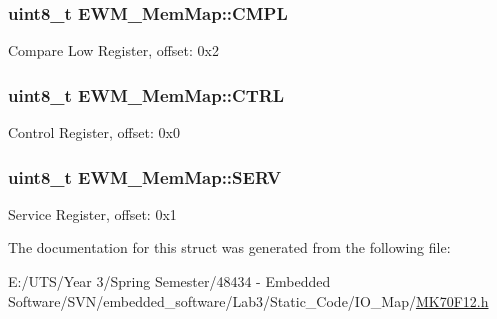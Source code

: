 \subsubsection[{C\+M\+P\+L}]{\setlength{\rightskip}{0pt plus 5cm}uint8\+\_\+t E\+W\+M\+\_\+\+Mem\+Map\+::\+C\+M\+P\+L}\label{struct_e_w_m___mem_map_ada0221f7554297f23a0257f54f28f5fc}
Compare Low Register, offset\+: 0x2 \hypertarget{struct_e_w_m___mem_map_a033a88d44ad1daa23ce3deb13bc94811}{}
\subsubsection[{C\+T\+R\+L}]{\setlength{\rightskip}{0pt plus 5cm}uint8\+\_\+t E\+W\+M\+\_\+\+Mem\+Map\+::\+C\+T\+R\+L}\label{struct_e_w_m___mem_map_a033a88d44ad1daa23ce3deb13bc94811}
Control Register, offset\+: 0x0 \hypertarget{struct_e_w_m___mem_map_aa9c25d4775f785d6911e096a226f4e40}{}
\subsubsection[{S\+E\+R\+V}]{\setlength{\rightskip}{0pt plus 5cm}uint8\+\_\+t E\+W\+M\+\_\+\+Mem\+Map\+::\+S\+E\+R\+V}\label{struct_e_w_m___mem_map_aa9c25d4775f785d6911e096a226f4e40}
Service Register, offset\+: 0x1 

The documentation for this struct was generated from the following file\+:\begin{DoxyCompactItemize}
\item 
E\+:/\+U\+T\+S/\+Year 3/\+Spring Semester/48434 -\/ Embedded Software/\+S\+V\+N/embedded\+\_\+software/\+Lab3/\+Static\+\_\+\+Code/\+I\+O\+\_\+\+Map/\hyperlink{_m_k70_f12_8h}{M\+K70\+F12.\+h}\end{DoxyCompactItemize}
